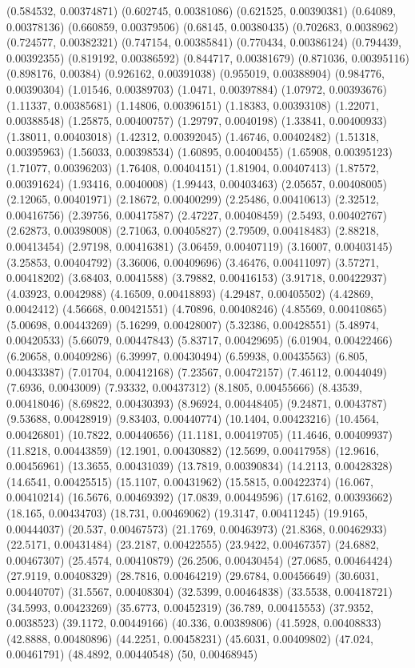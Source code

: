 {(0.584532, 0.00374871)
(0.602745, 0.00381086)
(0.621525, 0.00390381)
(0.64089, 0.00378136)
(0.660859, 0.00379506)
(0.68145, 0.00380435)
(0.702683, 0.0038962)
(0.724577, 0.00382321)
(0.747154, 0.00385841)
(0.770434, 0.00386124)
(0.794439, 0.00392355)
(0.819192, 0.00386592)
(0.844717, 0.00381679)
(0.871036, 0.00395116)
(0.898176, 0.00384)
(0.926162, 0.00391038)
(0.955019, 0.00388904)
(0.984776, 0.00390304)
(1.01546, 0.00389703)
(1.0471, 0.00397884)
(1.07972, 0.00393676)
(1.11337, 0.00385681)
(1.14806, 0.00396151)
(1.18383, 0.00393108)
(1.22071, 0.00388548)
(1.25875, 0.00400757)
(1.29797, 0.0040198)
(1.33841, 0.00400933)
(1.38011, 0.00403018)
(1.42312, 0.00392045)
(1.46746, 0.00402482)
(1.51318, 0.00395963)
(1.56033, 0.00398534)
(1.60895, 0.00400455)
(1.65908, 0.00395123)
(1.71077, 0.00396203)
(1.76408, 0.00404151)
(1.81904, 0.00407413)
(1.87572, 0.00391624)
(1.93416, 0.0040008)
(1.99443, 0.00403463)
(2.05657, 0.00408005)
(2.12065, 0.00401971)
(2.18672, 0.00400299)
(2.25486, 0.00410613)
(2.32512, 0.00416756)
(2.39756, 0.00417587)
(2.47227, 0.00408459)
(2.5493, 0.00402767)
(2.62873, 0.00398008)
(2.71063, 0.00405827)
(2.79509, 0.00418483)
(2.88218, 0.00413454)
(2.97198, 0.00416381)
(3.06459, 0.00407119)
(3.16007, 0.00403145)
(3.25853, 0.00404792)
(3.36006, 0.00409696)
(3.46476, 0.00411097)
(3.57271, 0.00418202)
(3.68403, 0.0041588)
(3.79882, 0.00416153)
(3.91718, 0.00422937)
(4.03923, 0.0042988)
(4.16509, 0.00418893)
(4.29487, 0.00405502)
(4.42869, 0.0042412)
(4.56668, 0.00421551)
(4.70896, 0.00408246)
(4.85569, 0.00410865)
(5.00698, 0.00443269)
(5.16299, 0.00428007)
(5.32386, 0.00428551)
(5.48974, 0.00420533)
(5.66079, 0.00447843)
(5.83717, 0.00429695)
(6.01904, 0.00422466)
(6.20658, 0.00409286)
(6.39997, 0.00430494)
(6.59938, 0.00435563)
(6.805, 0.00433387)
(7.01704, 0.00412168)
(7.23567, 0.00472157)
(7.46112, 0.0044049)
(7.6936, 0.0043009)
(7.93332, 0.00437312)
(8.1805, 0.00455666)
(8.43539, 0.00418046)
(8.69822, 0.00430393)
(8.96924, 0.00448405)
(9.24871, 0.0043787)
(9.53688, 0.00428919)
(9.83403, 0.00440774)
(10.1404, 0.00423216)
(10.4564, 0.00426801)
(10.7822, 0.00440656)
(11.1181, 0.00419705)
(11.4646, 0.00409937)
(11.8218, 0.00443859)
(12.1901, 0.00430882)
(12.5699, 0.00417958)
(12.9616, 0.00456961)
(13.3655, 0.00431039)
(13.7819, 0.00390834)
(14.2113, 0.00428328)
(14.6541, 0.00425515)
(15.1107, 0.00431962)
(15.5815, 0.00422374)
(16.067, 0.00410214)
(16.5676, 0.00469392)
(17.0839, 0.00449596)
(17.6162, 0.00393662)
(18.165, 0.00434703)
(18.731, 0.00469062)
(19.3147, 0.00411245)
(19.9165, 0.00444037)
(20.537, 0.00467573)
(21.1769, 0.00463973)
(21.8368, 0.00462933)
(22.5171, 0.00431484)
(23.2187, 0.00422555)
(23.9422, 0.00467357)
(24.6882, 0.00467307)
(25.4574, 0.00410879)
(26.2506, 0.00430454)
(27.0685, 0.00464424)
(27.9119, 0.00408329)
(28.7816, 0.00464219)
(29.6784, 0.00456649)
(30.6031, 0.00440707)
(31.5567, 0.00408304)
(32.5399, 0.00464838)
(33.5538, 0.00418721)
(34.5993, 0.00423269)
(35.6773, 0.00452319)
(36.789, 0.00415553)
(37.9352, 0.0038523)
(39.1172, 0.00449166)
(40.336, 0.00389806)
(41.5928, 0.00408833)
(42.8888, 0.00480896)
(44.2251, 0.00458231)
(45.6031, 0.00409802)
(47.024, 0.00461791)
(48.4892, 0.00440548)
(50, 0.00468945)
}

